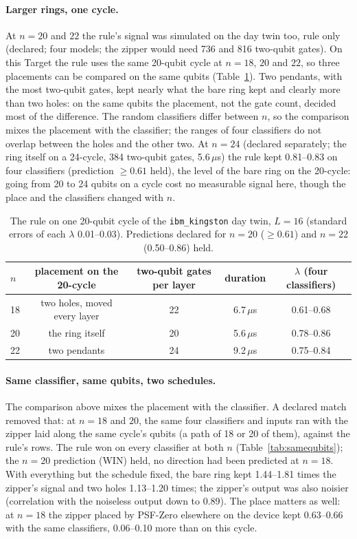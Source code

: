 \documentclass[11pt]{article}
\begin{document}
\paragraph{Larger rings, one cycle.} At $n = 20$ and $22$ the rule's signal was simulated on the day twin too, rule only
(declared; four models; the zipper would need 736 and 816 two-qubit gates). On this Target the rule uses the same
20-qubit cycle at $n = 18$, $20$ and $22$, so three placements can be compared on the same qubits
(Table~\ref{tab:onecycle}). Two pendants, with the most two-qubit gates, kept nearly what the bare ring kept and clearly
more than two holes: on the same qubits the placement, not the gate count, decided most of the difference. The random
classifiers differ between $n$, so the comparison mixes the placement with the classifier; the ranges of four
classifiers do not overlap between the holes and the other two.
At $n = 24$ (declared separately; the ring itself on a 24-cycle, 384 two-qubit gates, 5.6\,$\mu$s) the rule kept
0.81--0.83 on four classifiers (prediction $\ge 0.61$ held), the level of the bare ring on the 20-cycle: going from 20
to 24 qubits on a cycle cost no measurable signal here, though the place and the classifiers changed with $n$.

\begin{table}[h]
\centering
\small
\begin{tabular}{lcccc}
\toprule
$n$ & placement on the 20-cycle & two-qubit gates per layer & duration & $\lambda$ (four classifiers) \\
\midrule
18 & two holes, moved every layer & 22 & 6.7\,$\mu$s & 0.61--0.68 \\
20 & the ring itself & 20 & 5.6\,$\mu$s & 0.78--0.86 \\
22 & two pendants & 24 & 9.2\,$\mu$s & 0.75--0.84 \\
\bottomrule
\end{tabular}
\caption{The rule on one 20-qubit cycle of the \texttt{ibm\_kingston} day twin, $L = 16$ (standard errors of each
$\lambda$ 0.01--0.03). Predictions declared for $n = 20$ ($\ge 0.61$) and $n = 22$ (0.50--0.86) held.}
\label{tab:onecycle}
\end{table}

\paragraph{Same classifier, same qubits, two schedules.} The comparison above mixes the placement with the
classifier. A declared match removed that: at $n = 18$ and $20$, the same four classifiers and inputs ran with the
zipper laid along the same cycle's qubits (a path of 18 or 20 of them), against the rule's rows. The rule won on every
classifier at both $n$ (Table~\ref{tab:samequbits}); the $n = 20$ prediction (WIN) held, no direction had been
predicted at $n = 18$. With everything but the schedule fixed, the bare ring kept 1.44--1.81 times the zipper's signal
and two holes 1.13--1.20 times; the zipper's output was also noisier (correlation with the noiseless output down to
0.89). The place matters as well: at $n = 18$ the zipper placed by PSF-Zero elsewhere on the device kept 0.63--0.66
with the same classifiers, 0.06--0.10 more than on this cycle.
\end{document}

